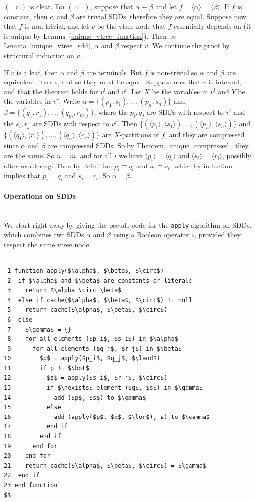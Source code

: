 \documentclass[11pt]{article}
\newenvironment{proof}[1][Proof]{\begin{trivlist}
\item[\hskip \labelsep {\bfseries #1}]}{\end{trivlist}}
\newcommand{\myparagraph}[1]{\paragraph{#1}\mbox{}\\}
\begin{document}
\begin{proof}
$(\Rightarrow)$ is clear. For $(\Leftarrow)$, suppose that $\alpha \equiv \beta$ and let $f = \langle \alpha \rangle = \langle \beta \rangle.$ If $f$ is constant, then $\alpha$ and $\beta$ are trivial SDDs, therefore they are equal.
Suppose  now that $f$ is non-trivial, and let $v$ be the vtree node that $f$ essentially depends on (it is unique by Lemma~\ref{unique_vtree_function}). Then by Lemma~\ref{unique_vtree_sdd}, $\alpha$ and $\beta$ respect $v$. 
We continue the proof by structural induction on $v$. 

If $v$ is a leaf, then $\alpha$ and $\beta$ are terminals. But $f$ is non-trivial so $\alpha$ and $\beta$ are equivalent literals, and so they must be equal. 
Suppose now that $v$ is internal, and that the theorem holds for $v^l$ and $v^r$. Let $X$ be the variables in $v^l$ and $Y$ be the variables in $v^r$. 
Write $\alpha = \{(p_1,s_1), ..., (p_n,s_n)\}$  and $\beta = \{(q_1,r_1), ..., (q_m,r_m)\}$, where the $p_i, q_j$ are SDDs with respect to $v^l$ and the $s_i, r_j$ are SDDs with respect to $v^r$. Then  $\{(\langle p_1 \rangle,\langle s_1\rangle), ..., (\langle p_n\rangle,\langle s_n\rangle)\}$ and  $\{(\langle q_1 \rangle,\langle r_1\rangle), ..., (\langle q_n\rangle,\langle r_n\rangle)\}$ are $X$-partitions of $f$, and they are compressed since $\alpha$ and $\beta$ are compressed SDDs. So by Theorem~\ref{unique_compressed}, they are the same. So $n = m$, and for all $i$ we have $\langle p_i\rangle = \langle q_i \rangle $ and $\langle s_i \rangle = \langle r_i\rangle$, possibly after reordering. Then by definition $p_i \equiv q_i$ and $s_i \equiv r_i$, which by induction implies that $p_i = q_i$ and $s_i = r_i$. So $\alpha = \beta$.
\end{proof}

\myparagraph{Operations on SDDs} 

We start right away by giving the pseudo-code for the \texttt{apply} algorithm on SDDs, which combines two SDDs $\alpha$ and $\beta$ using a Boolean operator $\circ$, provided they respect the same vtree node.

\label{operations}
 
\begin{lstlisting}[mathescape]

 1 function apply($\alpha$, $\beta$, $\circ$)
 2  if $\alpha$ and $\beta$ are constants or literals
 3    return $\alpha \circ \beta$   
 4  else if cache($\alpha$, $\beta$, $\circ$) != null
 5    return cache($\alpha$, $\beta$, $\circ$)
 6  else
 7    $\gamma$ = {}
 8    for all elements ($p_i$, $s_i$) in $\alpha$
 9      for all elements ($q_j$, $r_j$) in $\beta$ 
10        $p$ = apply($p_i$, $q_j$, $\land$)
11        if p != $\bot$
12          $s$ = apply($s_i$, $r_j$, $\circ$)
13          if $\nexists$ element ($q$, $s$) in $\gamma$
14            add ($p$, $s$) to $\gamma$
15          else 
16            add (apply($p$, $q$, $\lor$), s) to $\gamma$
17          end if
18        end if
19      end for
20    end for
21    return cache($\alpha$, $\beta$, $\circ$) = $\gamma$
22  end if
23 end function
$$
\end{lstlisting}
\end{document}

